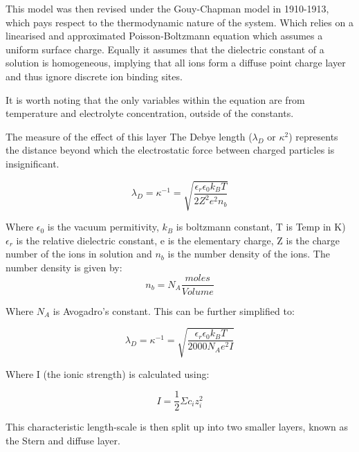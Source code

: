 This model was then revised under the Gouy-Chapman model in 1910-1913, \cite{34} which pays respect to the thermodynamic nature of the system. Which relies on a linearised and approximated Poisson-Boltzmann equation %
which assumes a uniform surface charge. Equally it assumes that the dielectric constant of a solution is homogeneous, implying that all ions form a diffuse point charge layer and thus ignore discrete ion binding sites. 

It is worth noting that the only variables within the equation are from temperature and electrolyte concentration, outside of the constants.

The measure of the effect of this layer The Debye length ($\lambda_D$ or $\kappa^2$) represents the distance beyond which the electrostatic force between charged particles is insignificant.

\begin{equation}
\lambda_D = \kappa^{-1} = \sqrt{ \frac{ \epsilon_r \epsilon_0 k_B T}{2Z^2 e^2 n_b}}
\end{equation}

Where $\epsilon_0$ is the vacuum permitivity, $k_B$ is boltzmann constant, T is  Temp in K) 
$\epsilon_r$ is the relative dielectric constant, e is the elementary charge, Z is the charge number of the ions in solution and $n_b$ is the number density of the ions. %
The number density is given by:
\begin{equation}
n_b = N_A \frac{moles} {Volume}
\end{equation}

Where $N_A$ is Avogadro's constant. This can be further simplified to:

\begin{equation}
 \lambda_D = \kappa^{-1} = \sqrt{ \frac{ \epsilon_r \epsilon_0 k_B T}{2000N_A e^2 I}}
\end{equation}

Where I (the ionic strength) is calculated using:

\begin{equation} 
I = \frac{1}{2} \Sigma c_i z_i^2
\end{equation}

This characteristic length-scale is then split up into two smaller layers, known as the Stern and diffuse layer.

